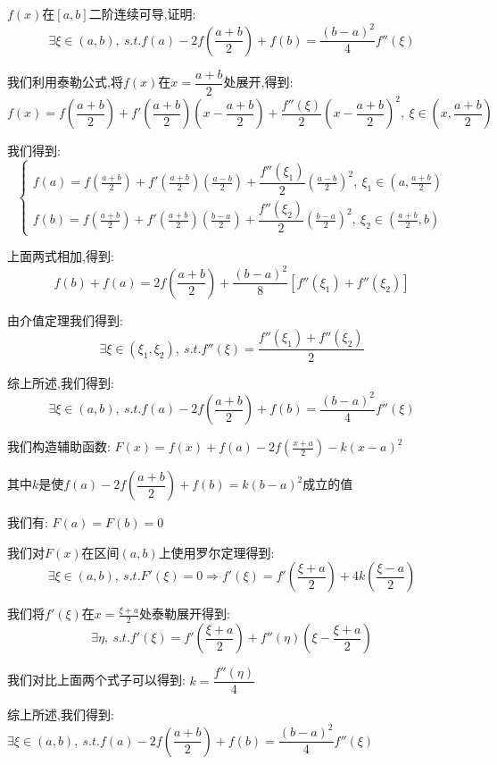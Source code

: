 \begin{proposition}
	$f(x)$在$[a,b]$二阶连续可导,证明: $$\exists \xi\in(a,b),\ s.t. f(a)-2f(\dfrac{a+b}{2})+f(b)=\dfrac{(b-a)^2}{4}f''(\xi)$$
\end{proposition}
\begin{solution}

	我们利用泰勒公式,将$f(x)$在$x=\dfrac{a+b}{2}$处展开,得到:
	$$f(x)=f(\frac{a+b}{2})+f'(\frac{a+b}{2})(x-\frac{a+b}{2})+\dfrac{f''(\xi)}{2}(x-\frac{a+b}{2})^2,\ \xi\in(x,\frac{a+b}{2})$$

	我们得到:
	$$\left\lbrace
		\begin{array}{l}
			f(a)=f(\frac{a+b}{2})+f'(\frac{a+b}{2})(\frac{a-b}{2})+\dfrac{f''(\xi_{1})}{2}(\frac{a-b}{2})^2,\ \xi_{1}\in (a,\frac{a+b}{2}) \\
			f(b)=f(\frac{a+b}{2})+f'(\frac{a+b}{2})(\frac{b-a}{2})+\dfrac{f''(\xi_{2})}{2}(\frac{b-a}{2})^2,\ \xi_{2}\in (\frac{a+b}{2},b)
		\end{array}
		\right. $$

	上面两式相加,得到:
	$$f(b)+f(a)=2f(\frac{a+b}{2})+\dfrac{(b-a)^2}{8}[f''(\xi_{1})+f''(\xi_{2})]$$

	由介值定理我们得到:
	$$\exists\xi\in(\xi_{1},\xi_{2}),\ s.t. f''(\xi)=\dfrac{f''(\xi_{1})+f''(\xi_{2})}{2}$$

	综上所述,我们得到:
	$$\exists \xi\in(a,b),\ s.t. f(a)-2f(\dfrac{a+b}{2})+f(b)=\dfrac{(b-a)^2}{4}f''(\xi)$$
\end{solution}
\begin{anymark}[常数$K$值法]
	我们构造辅助函数: $F(x)=f(x)+f(a)-2f(\frac{x+a}{2})-k(x-a)^2$

	其中$k$是使$f(a)-2f(\dfrac{a+b}{2})+f(b)=k(b-a)^2$成立的值

	我们有: $F(a)=F(b)=0$

	我们对$F(x)$在区间$(a,b)$上使用罗尔定理得到:
	$$\exists \xi\in(a,b),\ s.t. F'(\xi)=0\Rightarrow f'(\xi)=f'(\frac{\xi+a}{2})+4k(\frac{\xi-a}{2})$$

	我们将$f'(\xi)$在$x=\frac{\xi+a}{2}$处泰勒展开得到:
	$$\exists\eta,\ s.t. f'(\xi)=f'(\frac{\xi+a}{2})+f''(\eta)(\xi-\frac{\xi+a}{2})$$

	我们对比上面两个式子可以得到: $k=\dfrac{f''(\eta)}{4}$

	综上所述,我们得到: $\exists \xi\in(a,b),\ s.t. f(a)-2f(\dfrac{a+b}{2})+f(b)=\dfrac{(b-a)^2}{4}f''(\xi)$
\end{anymark}

